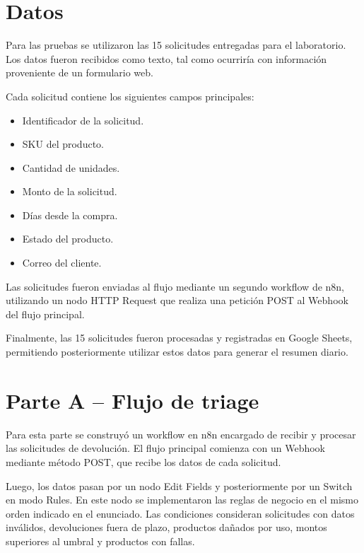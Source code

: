 \documentclass[11pt]{article}
\begin{document}
\section{Datos}

Para las pruebas se utilizaron las 15 solicitudes entregadas para el laboratorio. Los datos fueron recibidos como texto, tal como ocurriría con información proveniente de un formulario web.

Cada solicitud contiene los siguientes campos principales:

\begin{itemize}
    \item Identificador de la solicitud.
    \item SKU del producto.
    \item Cantidad de unidades.
    \item Monto de la solicitud.
    \item Días desde la compra.
    \item Estado del producto.
    \item Correo del cliente.
\end{itemize}

Las solicitudes fueron enviadas al flujo mediante un segundo workflow de n8n, utilizando un nodo HTTP Request que realiza una petición POST al Webhook del flujo principal.

Finalmente, las 15 solicitudes fueron procesadas y registradas en Google Sheets, permitiendo posteriormente utilizar estos datos para generar el resumen diario.



\newpage

\section{Parte A -- Flujo de triage}

Para esta parte se construyó un workflow en n8n encargado de recibir y procesar las solicitudes de devolución. El flujo principal comienza con un Webhook mediante método POST, que recibe los datos de cada solicitud.

Luego, los datos pasan por un nodo Edit Fields y posteriormente por un Switch en modo Rules. En este nodo se implementaron las reglas de negocio en el mismo orden indicado en el enunciado. Las condiciones consideran solicitudes con datos inválidos, devoluciones fuera de plazo, productos dañados por uso, montos superiores al umbral y productos con fallas.
\end{document}
